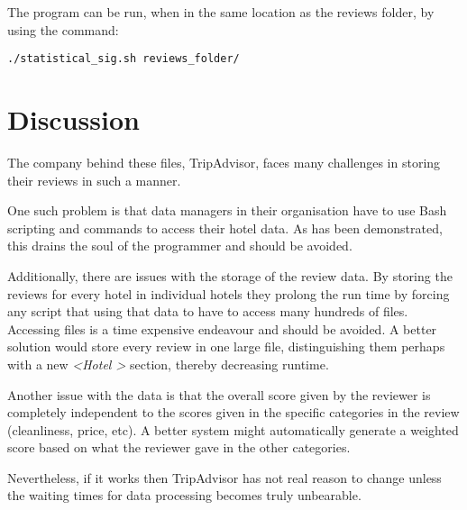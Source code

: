 \documentclass{article}
\begin{document}
The program can be run, when in the same location as the reviews folder, by using the command:

\begin{lstlisting}
./statistical_sig.sh reviews_folder/
\end{lstlisting}

\section{Discussion}

The company behind these files, TripAdvisor, faces many challenges in storing their reviews in such a manner. \par One such problem is that data managers in their organisation have to use Bash scripting and commands to access their hotel data. As has been demonstrated, this drains the soul of the programmer and should be avoided. \par Additionally, there are issues with the storage of the review data. By storing the reviews for every hotel in individual hotels they prolong the run time by forcing any script that using that data to have to access many hundreds of files. Accessing files is a time expensive endeavour and should be avoided. A better solution would store every review in one large file, distinguishing them perhaps with a new \textit{\textless Hotel \textgreater} section, thereby decreasing runtime. \par Another issue with the data is that the overall score given by the reviewer is completely independent to the scores given in the specific categories in the review (cleanliness, price, etc). A better system might automatically generate a weighted score based on what the reviewer gave in the other categories. \par Nevertheless, if it works then TripAdvisor has not real reason to change unless the waiting times for data processing becomes truly unbearable.
\end{document}
